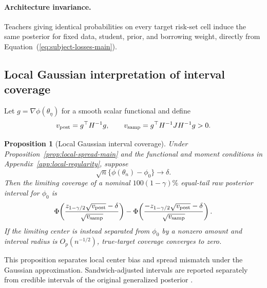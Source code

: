 \documentclass{article} %
\renewcommand{\eqref}[1]{\textup{(\ref{#1})}}
\newtheorem{proposition}{Proposition}
\begin{document}
\paragraph{Architecture invariance.}
Teachers giving identical probabilities on every target risk-set cell induce the same posterior for fixed data, student, prior, and borrowing weight, directly from Equation~\eqref{eq:subject-losses-main}.



\subsection{Local Gaussian interpretation of interval coverage}
\label{app:coverage}

Let $g=\nabla\phi(\theta_\eta)$ for a smooth scalar functional and define
\begin{equation}
v_{\rm post}=g^\top H^{-1}g,\qquad
v_{\rm samp}=g^\top H^{-1}JH^{-1}g>0.
\label{eq:coverage-variances}
\end{equation}
\begin{proposition}[Local Gaussian interval coverage]
\label{prop:functional-coverage}
Under Proposition~\ref{prop:local-spread-main} and the functional and moment conditions in Appendix~\ref{app:local-regularity}, suppose
\begin{equation}
\sqrt n\{\phi(\theta_n)-\phi_0\}\longrightarrow\delta.
\label{eq:local-functional-bias}
\end{equation}
Then the limiting coverage of a nominal $100(1-\gamma)\%$ equal-tail raw posterior interval for $\phi_0$ is
\begin{equation}
\Phi\!\left(\frac{z_{1-\gamma/2}\sqrt{v_{\rm post}}-\delta}{\sqrt{v_{\rm samp}}}\right)
-\Phi\!\left(\frac{-z_{1-\gamma/2}\sqrt{v_{\rm post}}-\delta}{\sqrt{v_{\rm samp}}}\right).
\label{eq:coverage-limit}
\end{equation}
If the limiting center is instead separated from $\phi_0$ by a nonzero amount and interval radius is $O_p(n^{-1/2})$, true-target coverage converges to zero.
\end{proposition}

This proposition separates local center bias and spread mismatch under the Gaussian approximation. Sandwich-adjusted intervals are reported separately from credible intervals of the original generalized posterior \citep{shaby2014,syring2019calibrating}.
\end{document}
